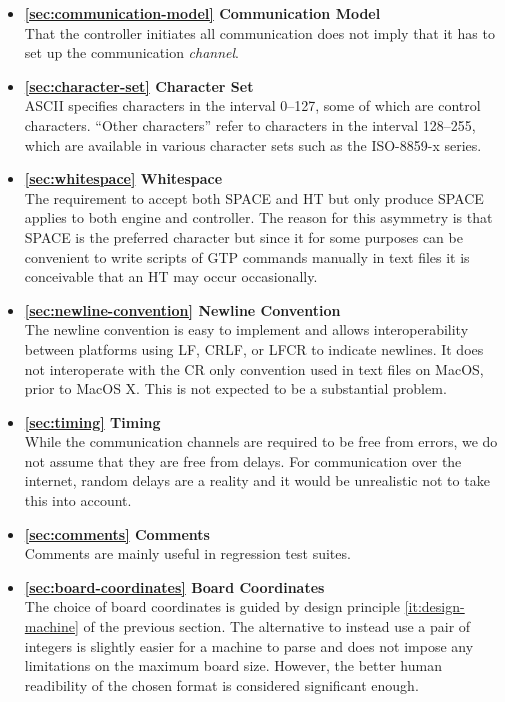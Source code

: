 \documentclass[a4paper]{article}
\begin{document}
\begin{itemize}
\item \textbf{\ref{sec:communication-model} Communication Model}\\
  That the controller initiates all communication does not imply that
  it has to set up the communication \emph{channel}.

\item \textbf{\ref{sec:character-set} Character Set}\\
  ASCII specifies characters in the interval 0--127, some of which are
  control characters. ``Other characters'' refer to characters in the
  interval 128--255, which are available in various character sets
  such as the ISO-8859-x series.

\item \textbf{\ref{sec:whitespace} Whitespace}\\
  The requirement to accept both SPACE and HT but only produce SPACE
  applies to both engine and controller. The reason for this asymmetry
  is that SPACE is the preferred character but since it for some
  purposes can be convenient to write scripts of GTP commands manually
  in text files it is conceivable that an HT may occur occasionally.

\item \textbf{\ref{sec:newline-convention} Newline Convention}\\
  The newline convention is easy to implement and allows
  interoperability between platforms using LF, CRLF, or LFCR to
  indicate newlines. It does not interoperate with the CR only
  convention used in text files on MacOS, prior to MacOS X. This is
  not expected to be a substantial problem.
  
\item \textbf{\ref{sec:timing} Timing}\\
  While the communication channels are required to be free from
  errors, we do not assume that they are free from delays. For
  communication over the internet, random delays are a reality and it
  would be unrealistic not to take this into account.

\item \textbf{\ref{sec:comments} Comments}\\
  Comments are mainly useful in regression test suites. 

\item \textbf{\ref{sec:board-coordinates} Board Coordinates}\\
  The choice of board coordinates is guided by design principle
  \ref{it:design-machine} of the previous section. The alternative to
  instead use a pair of integers is slightly easier for a machine to
  parse and does not impose any limitations on the maximum board size.
  However, the better human readibility of the chosen format is
  considered significant enough.


\end{itemize}
\end{document}
